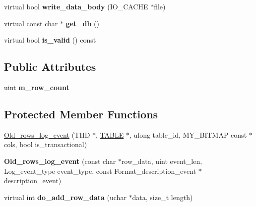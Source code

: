 \begin{DoxyCompactItemize}
\item 
\mbox{\label{classOld__rows__log__event_a05d80963d9ef21d7a55cb43b703a6515}} 
virtual bool {\bfseries write\+\_\+data\+\_\+body} (I\+O\+\_\+\+C\+A\+C\+HE $\ast$file)
\item 
\mbox{\label{classOld__rows__log__event_a305886d53e700ff0c422a3aba256ef32}} 
virtual const char $\ast$ {\bfseries get\+\_\+db} ()
\item 
\mbox{\label{classOld__rows__log__event_ad5af7edafa613e8c9477431220c22793}} 
virtual bool {\bfseries is\+\_\+valid} () const
\end{DoxyCompactItemize}
\subsection*{Public Attributes}
\begin{DoxyCompactItemize}
\item 
\mbox{\label{classOld__rows__log__event_a354f94db2a1c5861c95fe61ffaa22c0d}} 
uint {\bfseries m\+\_\+row\+\_\+count}
\end{DoxyCompactItemize}
\subsection*{Protected Member Functions}
\begin{DoxyCompactItemize}
\item 
\mbox{\hyperlink{classOld__rows__log__event_a8443dffe79cc86a0005b2592b16191a7}{Old\+\_\+rows\+\_\+log\+\_\+event}} (T\+HD $\ast$, \mbox{\hyperlink{structTABLE}{T\+A\+B\+LE}} $\ast$, ulong table\+\_\+id, M\+Y\+\_\+\+B\+I\+T\+M\+AP const $\ast$cols, bool is\+\_\+transactional)
\item 
\mbox{\label{classOld__rows__log__event_a02ae66cf2f7f58fb44151237fe13dfd1}} 
{\bfseries Old\+\_\+rows\+\_\+log\+\_\+event} (const char $\ast$row\+\_\+data, uint event\+\_\+len, Log\+\_\+event\+\_\+type event\+\_\+type, const Format\+\_\+description\+\_\+event $\ast$description\+\_\+event)
\item 
\mbox{\label{classOld__rows__log__event_a6977558b38aa1e379ec0c38549485605}} 
virtual int {\bfseries do\+\_\+add\+\_\+row\+\_\+data} (uchar $\ast$data, size\+\_\+t length)
\end{DoxyCompactItemize}
